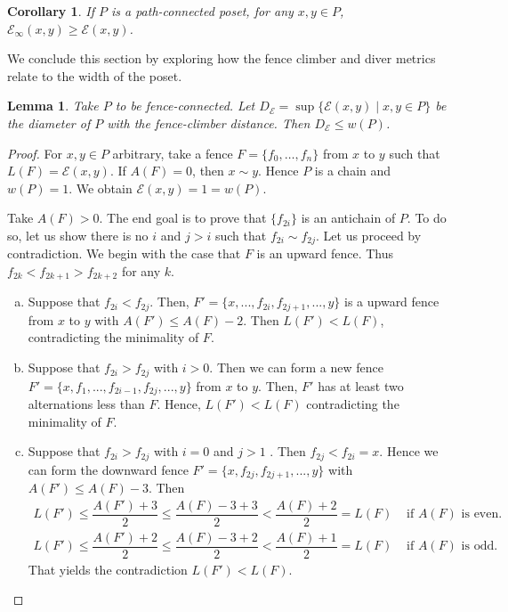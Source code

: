 \documentclass{article}[12pt]
\theoremstyle{exampstyle}
\newtheorem{corollary}[theorem]{Corollary}
\newtheorem{lemma}[theorem]{Lemma}
\theoremstyle{remark}
\newcommand{\E}{\mathcal{E}}
\newcommand{\tuple}[3][1]{#2_{#1}, \dots , #2_{#3}}
\begin{document}
\begin{corollary}
    If $P$ is a path-connected poset, for any $x,y \in P$, $\E_{\infty}(x,y) \geq \E(x,y)$.
\end{corollary}

We conclude this section by exploring how the fence climber and diver metrics relate to the width of the poset.

\begin{lemma}
 Take $P$ to be fence-connected. Let $D_{\E} = \sup \{ \E(x,y) \mid x,y \in P \}$ be the diameter of $P$ with the fence-climber distance. Then \hbox{$D_{\E} \leq w(P)$}.
 \label{lemma_infty_diam}
\end{lemma}
\begin{proof}
    For $x,y \in P$ arbitrary, take a fence $F = \{\tuple[0]{f}{n}\}$ from $x$ to $y$ such that $L(F) = \E(x,y)$. If $A(F) = 0$, then $x \sim y$. Hence $P$ is a chain and $w(P) = 1$. We obtain $\E(x,y) = 1 = w(P)$.  
    
    Take $A(F) > 0$. The end goal is to prove that $\{f_{2i}\}$ is an antichain of $P$. To do so, let us show there is no $i$ and $j > i$ such that $f_{2i} \sim f_{2j}$. Let us proceed by contradiction. We begin with the case that $F$ is an upward fence. Thus $f_{2k} < f_{2k+1} > f_{2k+2}$ for any $k$.
    \begin{enumerate}[a)]
        \item  Suppose that $f_{2i} < f_{2j}$. Then, $F' = \{ x, ..., f_{2i}, f_{2j+1}, ... ,y\}$ is a upward fence from $x$ to $y$ with \mbox{$A(F') \leq A(F) - 2$}. Then $L(F') < L(F)$, contradicting the minimality of $F$.
        \item  Suppose that $f_{2i} > f_{2j}$ with $i > 0$. Then we can form a new fence $F' = \{ x, f_1, ..., f_{2i-1}, f_{2j}, ... ,y\}$ from $x$ to $y$. Then, $F'$ has at least two alternations less than $F$. Hence, $L(F') < L(F)$ contradicting the minimality of $F$.
        \item  Suppose that $f_{2i} > f_{2j}$ with $i =0$ and $j>1$ . Then $f_{2j} < f_{2i} = x$. Hence we can form the downward fence $F' = \{ x, f_{2j}, f_{2j+1}, ..., y \}$ with $A(F') \leq A(F) - 3$. Then
         \begin{align*}
            L(F') \leq \dfrac{A(F') + 3}{2} \leq \dfrac{A(F)- 3 + 3}{2} < \dfrac{A(F)+2}{2} = L(F) &  \text{ if } A(F) \text{ is even}. \\
            L(F') \leq \dfrac{A(F') + 2}{2} \leq \dfrac{A(F) -3 + 2}{2} < \dfrac{A(F) +1}{2} =  L(F) &  \text{ if } A(F) \text{ is odd}.
        \end{align*}
        That yields the contradiction $L(F') < L(F)$.
        

\end{enumerate}
\end{proof}
\end{document}
